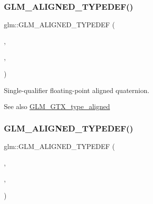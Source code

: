 \subsubsection{\texorpdfstring{G\+L\+M\+\_\+\+A\+L\+I\+G\+N\+E\+D\+\_\+\+T\+Y\+P\+E\+D\+E\+F()}{GLM\_ALIGNED\_TYPEDEF()}\hspace{0.1cm}{\footnotesize\ttfamily [205/209]}}
{\footnotesize\ttfamily glm\+::\+G\+L\+M\+\_\+\+A\+L\+I\+G\+N\+E\+D\+\_\+\+T\+Y\+P\+E\+D\+EF (\begin{DoxyParamCaption}\item[{\hyperlink{namespaceglm_ac1f6a5957091b849730ea6f05a6b7ad6}{quat}}]{,  }\item[{aligned\+\_\+quat}]{,  }\item[{16}]{ }\end{DoxyParamCaption})}

Single-\/qualifier floating-\/point aligned quaternion. \begin{DoxySeeAlso}{See also}
\hyperlink{group__gtx__type__aligned}{G\+L\+M\+\_\+\+G\+T\+X\+\_\+type\+\_\+aligned} 
\end{DoxySeeAlso}
\mbox{\label{group__gtx__type__aligned_gad8c4bfacff70e57dc8303634c8bfce35}} 
\subsubsection{\texorpdfstring{G\+L\+M\+\_\+\+A\+L\+I\+G\+N\+E\+D\+\_\+\+T\+Y\+P\+E\+D\+E\+F()}{GLM\_ALIGNED\_TYPEDEF()}\hspace{0.1cm}{\footnotesize\ttfamily [206/209]}}
{\footnotesize\ttfamily glm\+::\+G\+L\+M\+\_\+\+A\+L\+I\+G\+N\+E\+D\+\_\+\+T\+Y\+P\+E\+D\+EF (\begin{DoxyParamCaption}\item[{\hyperlink{namespaceglm_aa95d73f08018f3864c6ae08dbf1c59f2}{fquat}}]{,  }\item[{aligned\+\_\+fquat}]{,  }\item[{16}]{ }\end{DoxyParamCaption})}

